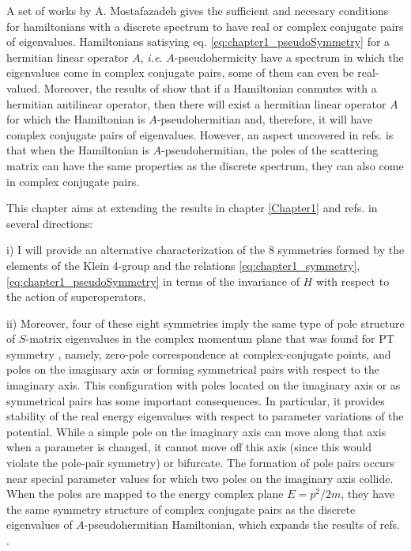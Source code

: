 A set of works by A. Mostafazadeh \cite{Mostafazadeh2002,Mostafazadeh2002a,Mostafazadeh2002b} gives the sufficient and necesary conditions for hamiltonians with a discrete spectrum to have real or complex conjugate pairs of eigenvalues. Hamiltonians satisying eq. \eqref{eq:chapter1_pseudoSymmetry} for a hermitian linear operator $A$, \textit{i.e.} $A$-pseudohermicity have a spectrum in which the eigenvalues come in complex conjugate pairs, some of them can even be real-valued. Moreover, the results of \cite{Mostafazadeh2002b} show that if a Hamiltonian conmutes with a hermitian antilinear operator, then there will exist a hermitian linear operator $A$ for which the Hamiltonian is $A$-pseudohermitian and, therefore, it will have complex conjugate pairs of eigenvalues. However, an aspect uncovered in refs. \cite{Mostafazadeh2002,Mostafazadeh2002a,Mostafazadeh2002b} is that when the Hamiltonian is $A$-pseudohermitian, the poles of the scattering matrix can have the same properties as the discrete spectrum, they can also come in complex conjugate pairs.

This chapter aims at extending the results in chapter \ref{Chapter1} and refs. \cite{Mostafazadeh2002,Mostafazadeh2002a,Mostafazadeh2002b} in several directions:

i) I will provide an alternative characterization of the 8 symmetries formed by the elements of the Klein 4-group and the relations \eqref{eq:chapter1_symmetry}, \eqref{eq:chapter1_pseudoSymmetry} in terms of the invariance of $H$ with respect to the action of superoperators.

ii) Moreover,
four of these eight symmetries imply the same
type of pole structure of $S$-matrix eigenvalues in the complex momentum plane that was found for PT symmetry \cite{Muga2004},
namely, zero-pole correspondence at complex-conjugate points, and poles on the imaginary axis or forming symmetrical pairs with respect to the imaginary
axis. This configuration with poles located on the imaginary  axis or as symmetrical pairs has some important consequences. In particular, it provides stability of the real energy eigenvalues with respect to parameter variations of the potential. While a simple pole on the imaginary axis can move along that axis when a parameter is changed, it cannot move off this axis (since this would violate the pole-pair symmetry) or bifurcate. The formation of pole pairs occurs near special  parameter values for which two poles on the imaginary axis collide. When the poles are mapped to the energy complex plane $E = p^2/2m$, they have the same symmetry structure of complex conjugate pairs as the discrete eigenvalues of $A$-pseudohermitian Hamiltonian, which expands the results of refs. \cite{Mostafazadeh2002,Mostafazadeh2002a,Mostafazadeh2002b}.

